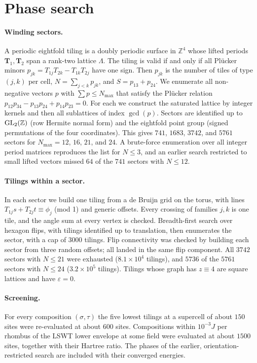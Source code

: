 \documentclass[aps,prb,twocolumn,superscriptaddress,floatfix]{revtex4-2}
\newcommand{\eps}{\varepsilon}
\begin{document}
\section{Phase search}\label{app:search}
\paragraph*{Winding sectors.} A periodic eightfold tiling is a doubly periodic surface in $\mathbb Z^4$ whose lifted periods $\mathbf T_1,\mathbf T_2$ span a rank-two lattice $\Lambda$. The tiling is valid if and only if all Pl\"ucker minors $p_{jk}=T_{1j}T_{2k}-T_{1k}T_{2j}$ have one sign. Then $p_{jk}$ is the number of tiles of type $(j,k)$ per cell, $N=\sum_{j<k}p_{jk}$, and $S=p_{13}+p_{24}$. We enumerate all non-negative vectors $p$ with $\sum p\le N_{\max}$ that satisfy the Pl\"ucker relation $p_{12}p_{34}-p_{13}p_{24}+p_{14}p_{23}=0$. For each we construct the saturated lattice by integer kernels and then all sublattices of index $\gcd(p)$. Sectors are identified up to ${\rm GL}_2(\mathbb Z)$ (row Hermite normal form) and the eightfold point group (signed permutations of the four coordinates). This gives $741$, $1683$, $3742$, and $5761$ sectors for $N_{\max}=12$, $16$, $21$, and $24$. A brute-force enumeration over all integer period matrices reproduces the list for $N\le3$, and an earlier search restricted to small lifted vectors missed $64$ of the $741$ sectors with $N\le12$.

\paragraph*{Tilings within a sector.} In each sector we build one tiling from a de Bruijn grid on the torus, with lines $T_{1j}s+T_{2j}t\equiv\phi_j$ (mod 1) and generic offsets. Every crossing of families $j,k$ is one tile, and the angle sum at every vertex is checked. Breadth-first search over hexagon flips, with tilings identified up to translation, then enumerates the sector, with a cap of $3000$ tilings. Flip connectivity was checked by building each sector from three random offsets; all landed in the same flip component. All $3742$ sectors with $N\le21$ were exhausted ($8.1\times10^4$ tilings), and $5736$ of the $5761$ sectors with $N\le24$ ($3.2\times10^5$ tilings). Tilings whose graph has $z\equiv4$ are square lattices and have $\eps=0$.

\paragraph*{Screening.} For every composition $(\sigma,\tau)$ the five lowest tilings at a supercell of about $150$ sites were re-evaluated at about $600$ sites. Compositions within $10^{-3}J$ per rhombus of the LSWT lower envelope at some field were evaluated at about $1500$ sites, together with their Hartree ratio. The phases of the earlier, orientation-restricted search are included with their converged energies.
\end{document}
